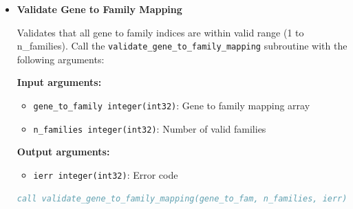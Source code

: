 \documentclass[11pt]{article}
\begin{document}
\begin{enumerate}
\begin{itemize}
	      	      \textbf{Input arguments:}
	      	      \begin{itemize}
	      	      	\item \texttt{string\_array character(len=*)}: String array to validate
	      	      	      
	      	      	\item \texttt{array\_name character(len=*)}: Name for error messages
	      	      \end{itemize}
	      	      \textbf{Output arguments:}
	      	      \begin{itemize}
	      	      	\item \texttt{ierr integer(int32)}: Error code
	      	      \end{itemize}
	      	      \begin{lstlisting}[language=Fortran, caption={Validate String Array}]
call validate_empty_strings(gene_ids, "Gene IDs", ierr)
call validate_empty_strings(family_ids, "Family IDs", ierr)
	      	      \end{lstlisting}
	      	      
	      	\item \textbf{Validate Gene to Family Mapping}
	      	      
	      	      Validates that all gene to family indices are within valid range (1 to
	      	      n\_families). Call the \texttt{validate\_gene\_to\_family\_mapping} subroutine
	      	      with the following arguments:
	      	      
	      	      \textbf{Input arguments:}
	      	      \begin{itemize}
	      	      	\item \texttt{gene\_to\_family integer(int32)}: Gene to family mapping
	      	      	      array
	      	      	      
	      	      	\item \texttt{n\_families integer(int32)}: Number of valid families
	      	      \end{itemize}
	      	      \textbf{Output arguments:}
	      	      \begin{itemize}
	      	      	\item \texttt{ierr integer(int32)}: Error code
	      	      \end{itemize}
	      	      \begin{lstlisting}[language=Fortran, caption={Validate Gene-Family Mapping}]
call validate_gene_to_family_mapping(gene_to_fam, n_families, ierr)
	      	      \end{lstlisting}
	      	      

\end{itemize}
\end{enumerate}
\end{document}
